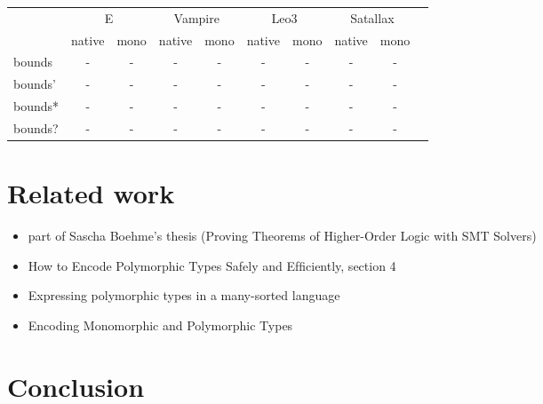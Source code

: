 \documentclass{article}
\begin{document}
\bigskip
\bigskip
\bigskip

\begin{center}
\begin{tabular}{lccccccccc}
   \toprule
   & \multicolumn{2}{c}{E}   & \multicolumn{2}{c}{Vampire} &\multicolumn{2}{c}{Leo3} & \multicolumn{2}{c}{Satallax} \\
   \cmidrule(lr){2-3} \cmidrule(lr){4-5} \cmidrule(lr){6-7} \cmidrule(lr){8-9}
   & native & mono & native & mono & native & mono & native & mono\\
   \midrule
   bounds  & - & - & - & - & - & - & - & - \\
   bounds' & - & - & - & - & - & - & - & - \\
   bounds* & - & - & - & - & - & - & - & - \\
   bounds? & - & - & - & - & - & - & - & - \\
   \bottomrule
\end{tabular}
\end{center}

\break

\section{Related work}

\begin{itemize}
    \item part of Sascha Boehme's thesis (Proving Theorems of Higher-Order Logic with SMT Solvers)
    \item How to Encode Polymorphic Types Safely and Efﬁciently, section 4

    \item Expressing polymorphic types in a many-sorted language
    \item Encoding Monomorphic and Polymorphic Types
\end{itemize}

\section{Conclusion}


\end{document}
